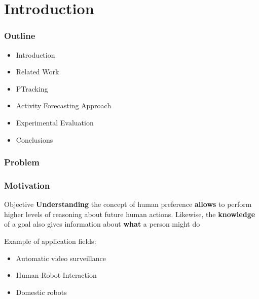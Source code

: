 \section{Introduction}

\begin{frame}
	\frametitle{Outline}
	
	\LARGE
	
	\begin{itemize}
		\item Introduction
		\item Related Work
		\item PTracking
		\item Activity Forecasting Approach
		\item Experimental Evaluation
		\item Conclusions
	\end{itemize}
\end{frame}

\begin{frame}
	\frametitle{Problem}
	
	\begin{center}
	\end{center}
\end{frame}

\begin{frame}
	\frametitle{Motivation}
	
	\vspace{0.2cm}
	
	\Large
	
	\begin{block}{Objective}
		\textbf{Understanding} the concept of human preference \textbf{allows} to perform higher levels
		of reasoning about future human actions. Likewise, the \textbf{knowledge} of a goal also gives
		information about \textbf{what} a person might do
	\end{block}
	
	\vspace{0.3cm}
	
	Example of application fields:
	\begin{itemize}
		\item Automatic video surveillance
		\item Human-Robot Interaction
		\item Domestic robots
	\end{itemize}
\end{frame}


